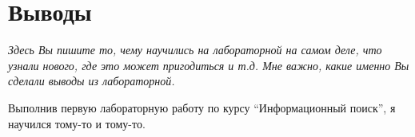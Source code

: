 \section{Выводы}
{\itshape Здесь Вы пишите то, чему научились на лабораторной на самом деле, что узнали нового, где это может пригодиться и т.д. Мне важно, какие именно Вы сделали выводы из лабораторной.}

Выполнив первую лабораторную работу по курсу \enquote{Информационный поиск}, я научился тому-то и тому-то.
\pagebreak
